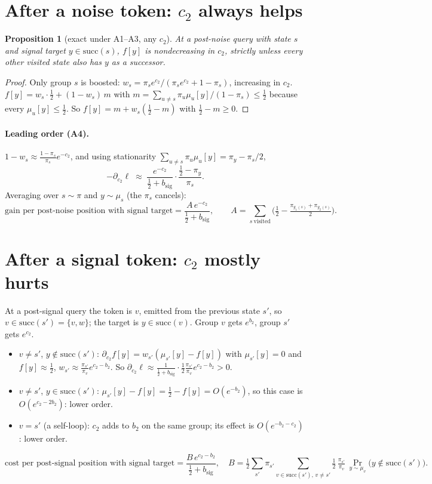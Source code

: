 \documentclass[11pt]{article}
\newtheorem{proposition}{Proposition}
\theoremstyle{remark}\newtheorem{remark}{Remark}
\newcommand{\1}{\mathbf{1}}
\begin{document}
\section{After a noise token: $c_2$ always helps}
\begin{proposition}[exact under A1--A3, any $c_2$]
At a post-noise query with state $s$ and signal target $y\in\mathrm{succ}(s)$, $f[y]$ is
nondecreasing in $c_2$, strictly unless every other visited state also has $y$ as a successor.
\end{proposition}
\begin{proof}
Only group $s$ is boosted: $w_s=\pi_se^{c_2}/(\pi_se^{c_2}+1-\pi_s)$, increasing in $c_2$.
$f[y]=w_s\cdot\tfrac12+(1-w_s)\,m$ with $m=\sum_{u\ne s}\pi_u\mu_u[y]/(1-\pi_s)\le\tfrac12$ because
every $\mu_u[y]\le\tfrac12$. So $f[y]=m+w_s(\tfrac12-m)$ with $\tfrac12-m\ge0$.
\end{proof}
\paragraph{Leading order (A4).} $1-w_s\approx\frac{1-\pi_s}{\pi_s}e^{-c_2}$, and using stationarity
$\sum_{u\ne s}\pi_u\mu_u[y]=\pi_y-\pi_s/2$,
\[
-\partial_{c_2}\ell\;\approx\;\frac{e^{-c_2}}{\tfrac12+b_{\mathrm{sig}}}\cdot\frac{\tfrac12-\pi_y}{\pi_s}.
\]
Averaging over $s\sim\pi$ and $y\sim\mu_s$ (the $\pi_s$ cancels):
\[
\text{gain per post-noise position with signal target}=\frac{A\,e^{-c_2}}{\tfrac12+b_{\mathrm{sig}}},\qquad
A=\sum_{s\ \text{visited}}\Big(\tfrac12-\tfrac{\pi_{y_1(s)}+\pi_{y_2(s)}}2\Big).
\]

\section{After a signal token: $c_2$ mostly hurts}
At a post-signal query the token is $v$, emitted from the previous state $s'$, so
$v\in\mathrm{succ}(s')=\{v,w\}$; the target is $y\in\mathrm{succ}(v)$. Group $v$ gets $e^{b_2}$,
group $s'$ gets $e^{c_2}$.
\begin{itemize}
\item $v\neq s'$, $y\notin\mathrm{succ}(s')$: $\partial_{c_2}f[y]=w_{s'}(\mu_{s'}[y]-f[y])$ with
$\mu_{s'}[y]=0$ and $f[y]\approx\tfrac12$, $w_{s'}\approx\frac{\pi_{s'}}{\pi_v}e^{c_2-b_2}$. So
$\partial_{c_2}\ell\approx\frac{1}{\tfrac12+b_{\mathrm{sig}}}\cdot\tfrac12\frac{\pi_{s'}}{\pi_v}e^{c_2-b_2}>0$.
\item $v\neq s'$, $y\in\mathrm{succ}(s')$: $\mu_{s'}[y]-f[y]=\tfrac12-f[y]=O(e^{-b_2})$, so this case
is $O(e^{c_2-2b_2})$: lower order.
\item $v=s'$ (a self-loop): $c_2$ adds to $b_2$ on the same group; its effect is
$O(e^{-b_2-c_2})$: lower order.
\end{itemize}
\[
\text{cost per post-signal position with signal target}=\frac{B\,e^{c_2-b_2}}{\tfrac12+b_{\mathrm{sig}}},\quad
B=\tfrac12\sum_{s'}\pi_{s'}\!\!\sum_{v\in\mathrm{succ}(s'),\,v\ne s'}\!\!\tfrac12\,\tfrac{\pi_{s'}}{\pi_v}\,
\Pr_{y\sim\mu_v}\!\big(y\notin\mathrm{succ}(s')\big).
\]
\end{document}
